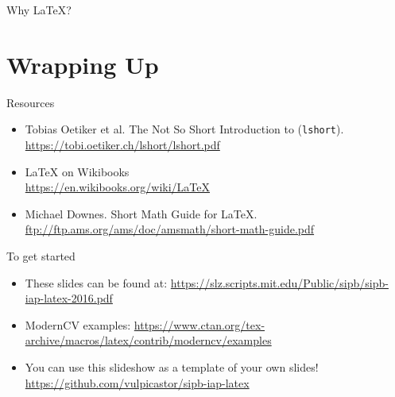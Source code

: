 \documentclass{beamer}
\newcommand{\pLaTeX}{{\rmfamily\LaTeX}}
\begin{document}
\begin{frame}{Why \pLaTeX?}

\end{frame}


\section{Wrapping Up}

\begin{frame}{Resources}
\begin{itemize}
    \item Tobias Oetiker et al. The Not So Short Introduction to {\rmfamily\LaTeXe} (\texttt{lshort}).\\
        \url{https://tobi.oetiker.ch/lshort/lshort.pdf}
    \item {\rmfamily\LaTeX} on Wikibooks\\
        \url{https://en.wikibooks.org/wiki/LaTeX}
    \item Michael Downes. Short Math Guide for {\rmfamily\LaTeX}.\\
        \url{ftp://ftp.ams.org/ams/doc/amsmath/short-math-guide.pdf}
\end{itemize}
\end{frame}

\begin{frame}{To get started}
\begin{itemize}
    \item These slides can be found at:
        \url{https://slz.scripts.mit.edu/Public/sipb/sipb-iap-latex-2016.pdf}
    \item ModernCV examples:
        \url{https://www.ctan.org/tex-archive/macros/latex/contrib/moderncv/examples}
    \item You can use this slideshow as a template of your own slides!
        \url{https://github.com/vulpicastor/sipb-iap-latex}
\end{itemize}
\end{frame}
\end{document}
